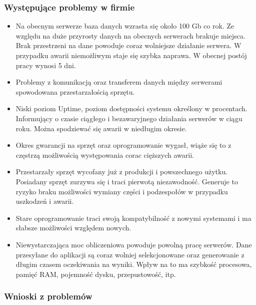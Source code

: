 \documentclass[a4paper, 12pt]{article}
\begin{document}
\subsubsection{Występujące problemy w firmie} 
		\begin{itemize}
		        \item Na obecnym serwerze baza danych wzrasta się około 100 Gb co rok. Ze względu na duże przyrosty danych na obecnych serwerach brakuje miejsca. Brak przestrzeni na dane powoduje coraz wolniejsze działanie serwera. W przypadku awarii niemożliwym staje się szybka naprawa. W obecnej postój pracy wynosi 5 dni.
	        	\item Problemy z komunikacją oraz transferem danych między serwerami spowodowana przestarzałością sprzętu.
	        	\item Niski poziom Uptime, poziom dostępności systemu określony w procentach. Informujący o czasie ciągłego i bezawaryjnego działania serwerów w ciągu roku. Można spodziewać się awarii w niedługim okresie.
	        	\item Okres gwarancji na sprzęt oraz oprogramowanie wygasł, wiąże się to z częstrzą możliwością występowania corac cięższych awarii.
	        	\item Przestarzały sprzęt wycofany już z produkcji i powszechnego użytku. Posiadany sprzęt zurzywa się i traci pierwotą niezawodność. Generuje to ryzyko braku możliwości wymiany części i podzespołów w przypadku uszkodzeń i awarii.
	        	\item  Stare oprogramowanie traci swoją kompatybilność z nowymi systemami i ma słabsze możliwości względem nowych.
	        	\item Niewystarczająca moc obliczeniowa powoduje powolną pracę serwerów. Dane przesyłane do aplikacji są coraz wolniej selekcjonowane oraz generowanie z długim czasem oczekiwania na wyniki. Wpływ na to ma szybkość procesowa, pamięć RAM, pojemność dysku, przepustowość, itp.
		    \end{itemize}
	  \subsubsection{Wnioski z problemów} 
	
\end{document}
